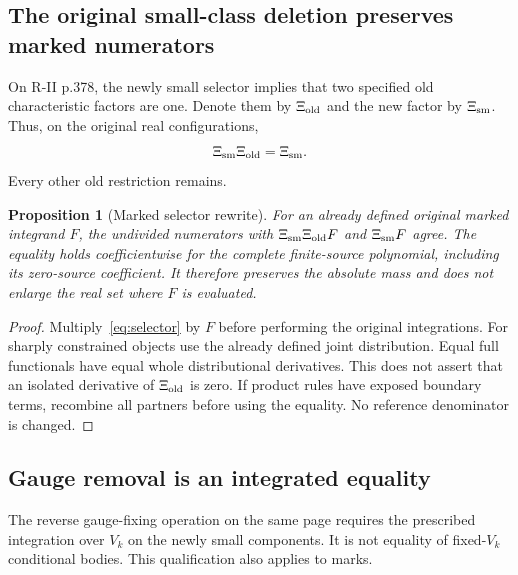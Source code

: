 \documentclass[11pt,letterpaper]{article}
\theoremstyle{plain}
\newtheorem{proposition}[theorem]{Proposition}
\theoremstyle{remark}\newtheorem{remark}[theorem]{Scope}
\begin{document}
\subsection{The original small-class deletion preserves marked numerators}

On R-II p.378, the newly small selector implies that two specified old
characteristic factors are one. Denote them by $\Xi_{\rm old}$ and the new
factor by $\Xi_{\rm sm}$. Thus, on the original real configurations,
\begin{equation}
\Xi_{\rm sm}\Xi_{\rm old}=\Xi_{\rm sm}.
\label{eq:selector}
\end{equation}
Every other old restriction remains.

\begin{proposition}[Marked selector rewrite]
For an already defined original marked integrand $F$, the undivided
numerators with $\Xi_{\rm sm}\Xi_{\rm old}F$ and $\Xi_{\rm sm}F$ agree.
The equality holds coefficientwise for the complete finite-source polynomial,
including its zero-source coefficient. It therefore preserves the absolute
mass and does not enlarge the real set where $F$ is evaluated.
\end{proposition}
\begin{proof}
Multiply~\eqref{eq:selector} by $F$ before performing the original integrations.
For sharply constrained objects use the already defined joint distribution.
Equal full functionals have equal whole distributional derivatives. This
does not assert that an isolated derivative of $\Xi_{\rm old}$ is zero.
If product rules have exposed boundary terms, recombine all partners before
using the equality. No reference denominator is changed.
\end{proof}

\subsection{Gauge removal is an integrated equality}

The reverse gauge-fixing operation on the same page requires the prescribed
integration over $V_k$ on the newly small components. It is not equality of
fixed-$V_k$ conditional bodies. This qualification also applies to marks.
\end{document}
